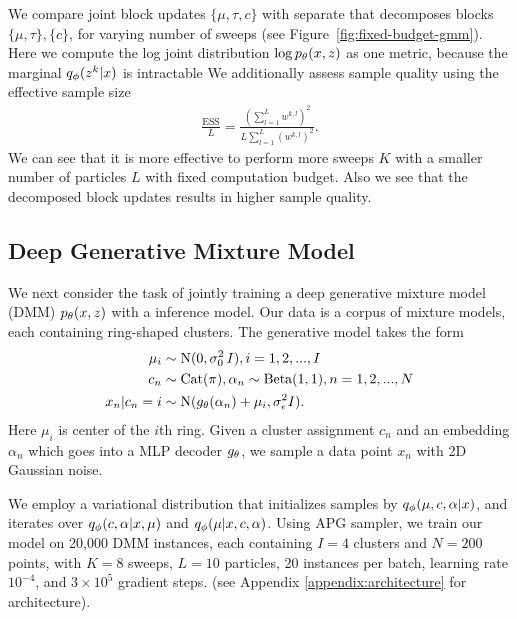 \documentclass{article}
\theoremstyle{definition}
\begin{document}
We compare joint block updates $\{\mu, \tau, c\}$ with separate that decomposes blocks $\{\mu, \tau\}, \{c\}$, for varying number of sweeps (see Figure~\ref{fig:fixed-budget-gmm}). Here we compute the log joint distribution $\log p_\theta(x, z)$ as one metric, because the marginal $q_\phi(z^k | x)$ is intractable%
We additionally assess sample quality using the effective sample size
\vspace{-0.5em}
\begin{align*}
    \frac{\text{ESS}}{L} 
    = 
    \frac{(\sum_{l=1}^L w^{k,l})^2}
         {L \sum_{l=1}^L (w^{k,l})^2}
    .
\end{align*}
We can see that it is more effective to perform more sweeps $K$ with a smaller number of particles $L$ with fixed computation budget. Also we see that the decomposed block updates results in higher sample quality.


\subsection{Deep Generative Mixture Model}
We next consider the task of jointly training a deep generative mixture model (DMM) $p_\theta(x, z)$ with a inference model. Our data is a corpus of mixture models, each containing ring-shaped clusters. The generative model takes the form
\begin{align*}
    \mu_i &\sim \text{N}(0, 
    \sigma_0^2 \, I), 
    i = 1, 2, ..., I \\
    c_n &\sim \mathrm{Cat}(\pi), \alpha_n \sim \text{Beta}(1, 1), n = 1, 2, ..., N \\
    x_n | c_n=i &\sim \text{N}(g_\theta(\alpha_n) + \mu_i, \sigma^2_{\epsilon} I).
\end{align*}
Here $\mu_i$ is center of the $i$th ring. Given a cluster assignment $c_n$ and an embedding $\alpha_n$ which goes into a MLP decoder $g_\theta$, we sample a data point $x_n$ with 2D Gaussian noise. 

We employ a variational distribution that initializes samples by $q_\phi(\mu, c, \alpha| x)$, and iterates over  $q_\phi(c, \alpha | x, \mu)$ and $q_\phi(\mu | x, c, \alpha)$. Using APG sampler, we train our model on 20,000 DMM instances, each containing $I = 4$ clusters and $N=200$ points, with $K=8$ sweeps, $L=10$ particles, 20 instances per batch, learning rate $10^{-4}$, and $3\times10^5$ gradient steps. (see Appendix \ref{appendix:architecture} for architecture).
\end{document}
